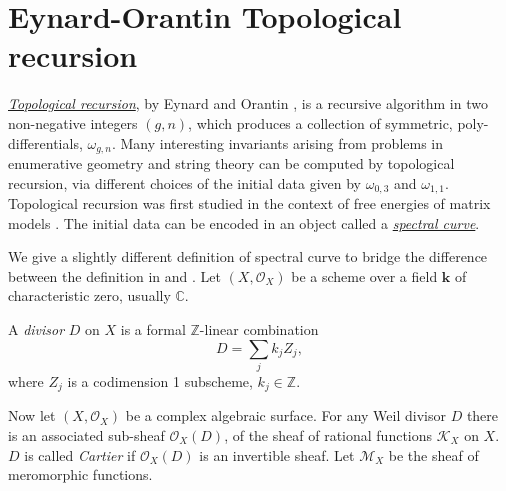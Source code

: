     
    
    \section{Eynard-Orantin Topological recursion}


    \emph{\hyperref[defn:tr]{Topological recursion}}, by Eynard and Orantin \cite{eynard_orantin}, is a recursive algorithm in two non-negative integers \((g,n)\), which produces a collection of symmetric, poly-differentials, \(\omega_{g,n}\). Many interesting invariants arising from problems in enumerative geometry and string theory can be computed by topological recursion, via different choices of the initial data given by \(\omega_{0,3}\) and \(\omega_{1,1}\). Topological recursion was first studied in the context of free energies of matrix models \cite{CEyHer}. The initial data can be encoded in an object called a \emph{\hyperref[defn:spectral_curve]{spectral curve}}.
    
    We give a slightly different definition of spectral curve
    to bridge the difference between the definition in \cite{eynard_orantin} and \cite{ks_airy}. Let \((X,\mathcal{O}_X) \) be a scheme over a field \( \mathbf{k}\) of characteristic zero, usually \( \mathbb{C}\).
    \begin{defn} A \emph{divisor} \(D\) on \(X\) is a formal \(\mathbb{Z}\)-linear combination 
    \[ D = \sum_j k_j Z_j,\]
    where \(Z_j\) is a codimension 1 subscheme, \(k_j \in \mathbb{Z}\).
    \end{defn}
    
    Now let \( (X,\mathcal{O}_X)\) be a complex algebraic surface. For any Weil divisor \(D\) there is an associated sub-sheaf \( \mathcal{O}_X(D)\), of the sheaf  of rational functions \(\mathcal{K}_X\) on \(X\). \( D\) is called \emph{Cartier} if \( \mathcal{O}_X(D)\) is an invertible sheaf. Let \( \mathcal{M}_X\) be the sheaf of meromorphic functions.
    


